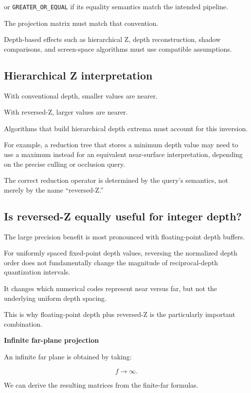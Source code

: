 or \texttt{GREATER\_OR\_EQUAL} if its equality semantics match the intended pipeline.

The projection matrix must match that convention.

Depth-based effects such as hierarchical Z, depth reconstruction, shadow comparisons, and screen-space algorithms must use compatible assumptions.

\subsection{Hierarchical Z interpretation}\label{02-foundations-ii-ch033-hierarchical-z-interpretation}

With conventional depth, smaller values are nearer.

With reversed-Z, larger values are nearer.

Algorithms that build hierarchical depth extrema must account for this inversion.

For example, a reduction tree that stores a minimum depth value may need to use a maximum instead for an equivalent near-surface interpretation, depending on the precise culling or occlusion query.

The correct reduction operator is determined by the query's semantics, not merely by the name ``reversed-Z.''

\subsection{Is reversed-Z equally useful for integer depth?}\label{02-foundations-ii-ch033-is-reversed-z-equally-useful-for-integer-depth}

The large precision benefit is most pronounced with floating-point depth buffers.

For uniformly spaced fixed-point depth values, reversing the normalized depth order does not fundamentally change the magnitude of reciprocal-depth quantization intervals.

It changes which numerical codes represent near versus far, but not the underlying uniform depth spacing.

This is why floating-point depth plus reversed-Z is the particularly important combination. 

\textbf{Infinite far-plane projection}

An infinite far plane is obtained by taking:

\[
 \boxed{f\to\infty}.
\]

We can derive the resulting matrices from the finite-far formulas.

